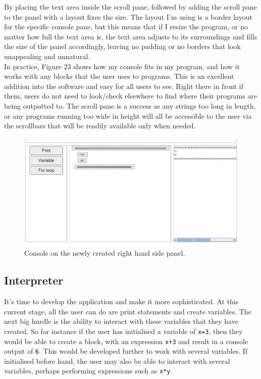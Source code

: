 \documentclass[a4paper, 12pt]{article}
\begin{document}
            By placing the text area inside the scroll pane, followed by adding the scroll pane to the panel
            with a layout fixes the size. The layout I'm using is a border layout for the specific console
            pane, but this means that if I resize the program, or no matter how full the text area is,
            the text area adjusts to its surroundings and fills the size of the panel accordingly, leaving
            no padding or no borders that look unappealing and unnatural. \\

            In practice, Figure 23 shows how my console fits in my program, and how it works with
            any blocks that the user uses to programs. This is an excellent addition into the software
            and easy for all users to see. Right there in front if them, users do not need to look/check
            elsewhere to find where their programs are being outputted to. The scroll pane is a success
            as any strings too long in length, or any programs running too wide in height will all be
            accessible to the user via the scrollbars that will be readily available only when needed.
            
            \begin{figure}[h]
                \centering
                \includegraphics[width=160mm]{console.png}
                \caption{Console on the newly created right hand side panel.}
            \end{figure}
          
        
        \clearpage
        \subsection{Interpreter}
            It's time to develop the application and make it more sophisticated. At this current stage, all
            the user can do are print statements and create variables. The next big hurdle is the ability
            to interact with these variables that they have created. So for instance if the user has
            initialised a variable of \texttt{x=3}, then they would be able to create a block, with an
            expression \texttt{x+3} and result in a console output of \texttt{6}. This would be developed
            further to work with several variables. If initialised before hand, the user may also be able
            to interact with several variables, perhaps performing expressions such as \texttt{x*y}.
\end{document}
